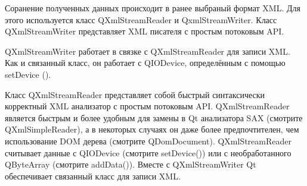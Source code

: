 Соранение полученных данных происходит в ранее выбраный формат XML. Для этого используется класс QXmlStreamReader и QxmlStreamWriter.
Класс QXmlStreamWriter представляет XML писателя с простым потоковым API.

QXmlStreamWriter работает в связке с QXmlStreamReader для записи XML. Как и связанный класс, он работает с QIODevice, определённым с помощью setDevice ().

Класс QXmlStreamReader представляет собой быстрый синтаксически корректный XML анализатор с простым потоковым API.
QXmlStreamReader является быстрым и более удобным для замены в Qt анализатора SAX (смотрите QXmlSimpleReader), а в некоторых случаях он даже более предпочтителен, чем использование DOM дерева (смотрите QDomDocument). QXmlStreamReader считывает данные с QIODevice (смотрите setDevice()) или с необработанного QByteArray (смотрите addData()). Вместе с QXmlStreamWriter Qt обеспечивает связанный класс для записи XML.
